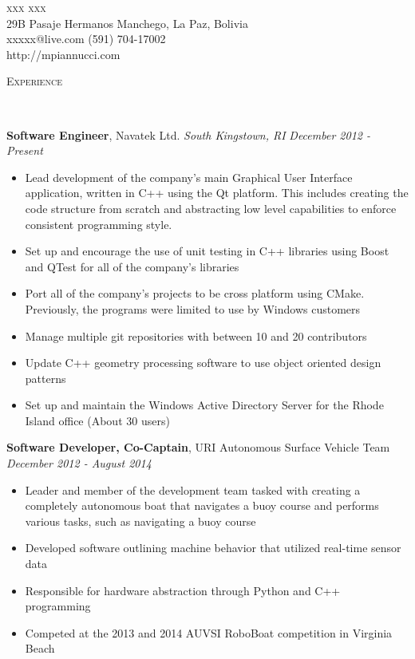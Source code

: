 \documentclass[10pt]{article}
\newenvironment{changemargin}[2]{%
  \begin{list}{}{%
    \setlength{\topsep}{0pt}%
    \setlength{\leftmargin}{#1}%
    \setlength{\rightmargin}{#2}%
    \setlength{\listparindent}{\parindent}%
    \setlength{\itemindent}{\parindent}%
    \setlength{\parsep}{\parskip}%
  }%
  \item[]}{\end{list}
}
\newcommand{\lineover}{
	\begin{changemargin}{-0.05in}{-0.05in}
		\vspace*{-8pt}
		\hrulefill \\
		\vspace*{-2pt}
	\end{changemargin}
}
\newcommand{\header}[1]{
	\begin{changemargin}{-0.5in}{-0.5in}
		\scshape{#1}\\
  	\lineover
	\end{changemargin}
}
\newcommand{\contact}[6]{
	\begin{changemargin}{-0.5in}{-0.5in}
		\begin{center}
			{\Large \scshape {#1}}\\ \smallskip
			{#2}
			{#3} \\ 
			{#5}    
			{#6} \\ 
            {#4} \\ 
		\end{center}
	\end{changemargin}
}
\newenvironment{body} {
	\vspace*{-16pt}
	\begin{changemargin}{-0.25in}{-0.5in}
  }
	{\end{changemargin}
}
\begin{document}
 
\contact{xxx xxx}{29B Pasaje Hermanos Manchego,}{La Paz, Bolivia}{http://mpiannucci.com}{xxxxx@live.com}{(591) 704-17002}
 
\header{Experience}
 
\begin{body}
	\vspace{14pt}
	\smallskip
 
	\textbf{Software Engineer}, Navatek Ltd. \textit{South Kingstown, RI} \hfill \emph{December 2012 -  Present}\\
	\vspace*{-4pt}
	\begin{itemize} \itemsep -0pt
		\item Lead development of the company's main Graphical User Interface application, written in C++ using the Qt platform. This includes creating the code structure from scratch and abstracting low level capabilities to enforce consistent programming style.
		\item Set up and encourage the use of unit testing in C++ libraries using Boost and QTest for all of the company's libraries
        \item Port all of the company's projects to be cross platform using CMake. Previously, the programs were limited to use by Windows customers
		\item Manage multiple git repositories with between 10 and 20 contributors 
		\item Update C++ geometry processing software to use object oriented design patterns
		\item Set up and maintain the Windows Active Directory Server for the Rhode Island office (About 30 users)
	\end{itemize}
 
	\textbf{Software Developer, Co-Captain}, URI Autonomous Surface Vehicle Team \hfill \emph{December 2012 -  August 2014}\\
	\vspace*{-4pt}
	\begin{itemize} \itemsep -0pt
		\item Leader and member of the development team tasked with creating a completely autonomous boat that navigates a buoy course and performs various tasks, such as navigating a buoy course
		\item Developed software outlining machine behavior that utilized real-time sensor data
		\item Responsible for hardware abstraction through Python and C++ programming
		\item Competed at the 2013 and 2014 AUVSI RoboBoat competition in Virginia Beach
	\end{itemize}
 

\end{body}
\end{document}
